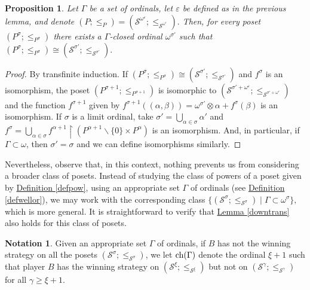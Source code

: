 \documentclass[reqno]{amsart}
\newtheorem{proposition}[theorem]{Proposition}
\theoremstyle{definition}
\newtheorem{notation}[theorem]{Notation}
\theoremstyle{definition}
\theoremstyle{plain} %
\begin{document}
\begin{proposition}
    Let $\Gamma $ be a set of ordinals, let $\varepsilon$ be defined as in the previous lemma, and denote \((P;\leq_P) = (\mathcal{S}^{\omega^\varepsilon}; \leq_{\mathcal{S}^{\omega^\varepsilon}}).\) Then, for every poset $(P^\sigma; \leq_{P^\sigma})$ there exists a $\Gamma$-closed ordinal $\omega^{\sigma'}$ such that \((P^\sigma; \leq_{P^\sigma})\cong(\mathcal{S}^{\sigma'}; \leq_{\mathcal{S}^{\sigma'}}).\)
\end{proposition}
\begin{proof}
    By transfinite induction. If \((P^\sigma; \leq_{P^\sigma})\cong(\mathcal{S}^{\sigma'}; \leq_{\mathcal{S}^{\sigma'}})\) and $f^\sigma$ is an isomorphism, the poset $(P^{\sigma+1}; \leq_{P^{\sigma+1}})$ is isomorphic to $(\mathcal{S}^{\sigma'+\omega^\varepsilon}; \leq_{\mathcal{S}^{\sigma'+\omega^\varepsilon}})$ and the function $f^{\sigma+1}$ given by $f^{\sigma+1}\left((\alpha,\beta)\right)=\omega^{\sigma'}\otimes\alpha+f^\sigma(\beta)$ is an isomorphism. If $\sigma$ is a limit ordinal, take $\sigma'=\bigcup_{\alpha\in\sigma}\alpha'$ and $f^{\sigma}=\bigcup_{\alpha\in\sigma}f^{\alpha+1}\upharpoonright(P^{\alpha+1}\backslash\{0\}\times P^\alpha)$ is an isomorphism. And, in particular, if $\Gamma\subset\omega$,  then $\sigma'=\sigma$ and we can define isomorphisms similarly.
\end{proof}

Nevertheless, observe that, in this context, nothing prevents us from considering a broader class of posets. Instead of studying the class of powers of a poset given by \hyperref[defpow]{Definition \ref{defpow}}, using an appropriate set $\Gamma$ of ordinals (see \hyperref[defwellor]{Definition \ref{defwellor}}), we may work with the corresponding class \( \{(\mathcal{S}^\sigma;\leq_{\mathcal{S}^\sigma}) \mid \Gamma \subset \omega^\sigma\},\) which is more general. It is straightforward to verify that \hyperref[downtrans]{Lemma \ref{downtrans}} also holds for this class of posets.
\begin{notation}
    Given an appropriate set $\Gamma$ of ordinals, if $B$ has not the winning strategy on all the posets $(\mathcal{S}^\sigma;\leq_{\mathcal{S}^\sigma})$, we let $\textnormal{ch}(\Gamma)$ denote the ordinal $\xi+1$ such that player $B $ has the winning strategy on $(\mathcal{S}^\xi;\leq_{\mathcal{S}^\xi})$ but not on $(\mathcal{S}^\gamma;\leq_{\mathcal{S}^\gamma}) $ for all $\gamma\geq\xi+1$.
\end{notation}
\end{document}
